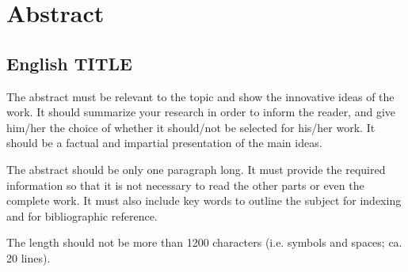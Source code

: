 \documentclass[./\jobname.tex]{subfiles}
\begin{document}
\chapter*{Abstract}
\section*{English TITLE}
%
The abstract must be relevant to the topic and show the innovative ideas of the work. It should summarize your research in order to inform the reader, and give him/her the choice of whether it should/not be selected for his/her work. It should be a factual and impartial presentation of the main ideas.\par
%
The abstract should be only one paragraph long. It must provide the required information so that it is not necessary to read the other parts or even the complete work. It must also include key words to outline the subject for indexing and for bibliographic reference.\par
%
The length should not be more than 1200 characters (i.e. symbols and spaces; ca. 20 lines).\par
%
\blindtext[2]
\end{document}
